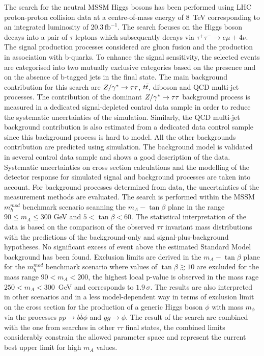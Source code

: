 The search for the neutral MSSM Higgs bosons has been performed using LHC proton-proton collision data at a centre-of-mass energy
of 8~TeV corresponding to an integrated luminosity of 20.3$\,\text{fb}^{-1}$. The search focuses on the Higgs boson decays
into a pair of $\tau$ leptons which subsequently decays via  $\tau^+ \tau^- \rightarrow e \mu +4\nu$.
The signal production processes considered are gluon fusion and the production in association with b-quarks. To enhance the signal 
sensitivity,  the  selected events are categorised into two mutually exclusive categories based on the presence
and on the absence of b-tagged jets in the final state. 
The main background contribution for this search are $Z/\gamma^*\rightarrow \tau\tau$, $t\bar{t}$, diboson and QCD multi-jet processes.
The contribution of the dominant $Z/\gamma^*\rightarrow \tau\tau$ background process is measured in a dedicated  signal-depleted control data sample
in order to reduce the systematic uncertainties of the simulation. Similarly, the QCD multi-jet background contribution 
is also estimated from a dedicated data control sample since this background process is hard to model. All the other 
backgrounds contribution are predicted using simulation. 
The background model is validated in several control data sample and  shows a good description of the data.
Systematic uncertainties  on cross section calculations and the modelling of the detector response for 
simulated signal and background processes are taken into account. For background processes  determined from  data,
the uncertainties of the measurement methods are evaluated.
The search is performed within the MSSM $m_h^{mod}$ benchmark scenario
scanning the $m_A - \tan\beta$ plane in the range $90 \leq m_A \leq 300$ GeV and $5 < \tan\beta < 60$.
The statistical interpretation of the data is based on the 
comparison of the observed $\tau\tau$ invariant mass distributions with the predictions of the  background-only and signal-plus-background
hypotheses. No significant excess of event above the estimated Standard Model background has been found. 
Exclusion limits are derived in the $m_A - \tan\beta$ plane for the $m_h^{mod}$ benchmark scenario where values of $\tan\beta \apprge 10$ are excluded 
for the mass range $90 < m_A < 200$,
the highest local p-value
is observed in the mass rage $250< m_A <300$~GeV and corresponds to $1.9\,\sigma$.
The results  are also interpreted in other scenarios and in a  less model-dependent way in terms of exclusion  limit on the cross section for 
the production of a generic Higgs boson $\phi$ with  mass  $m_\phi$ via the  processes $pp \rightarrow b\bar{b}\phi$ and $gg \rightarrow \phi$.
The result of the search are  combined with the one from  searches in other $\tau\tau$ final states, the combined limits considerably constrain
the allowed parameter space and represent the current best upper limit for high $m_A$ values. 

